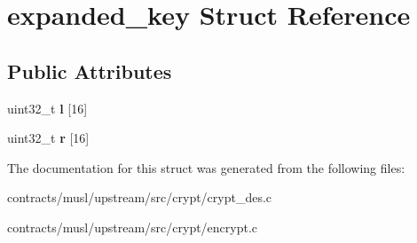 \hypertarget{structexpanded__key}{}\section{expanded\+\_\+key Struct Reference}
\label{structexpanded__key}
\subsection*{Public Attributes}
\begin{DoxyCompactItemize}
\item 
\mbox{\label{structexpanded__key_a9e863dd47835e31608eeeb8567d5111b}} 
uint32\+\_\+t {\bfseries l} \mbox{[}16\mbox{]}
\item 
\mbox{\label{structexpanded__key_ae802cb349143f7a4bfa0e7c4c9392aa0}} 
uint32\+\_\+t {\bfseries r} \mbox{[}16\mbox{]}
\end{DoxyCompactItemize}


The documentation for this struct was generated from the following files\+:\begin{DoxyCompactItemize}
\item 
contracts/musl/upstream/src/crypt/crypt\+\_\+des.\+c\item 
contracts/musl/upstream/src/crypt/encrypt.\+c\end{DoxyCompactItemize}
